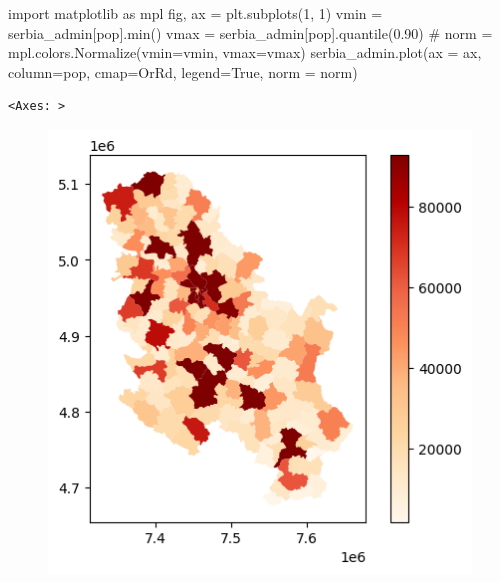\documentclass[
  letterpaper,
  DIV=11,
  numbers=noendperiod]{scrreprt}
\newenvironment{Shaded}{\begin{snugshade}}{\end{snugshade}}
\newcommand{\BuiltInTok}[1]{\textcolor[rgb]{0.00,0.23,0.31}{#1}}
\newcommand{\CommentTok}[1]{\textcolor[rgb]{0.37,0.37,0.37}{#1}}
\newcommand{\DecValTok}[1]{\textcolor[rgb]{0.68,0.00,0.00}{#1}}
\newcommand{\FloatTok}[1]{\textcolor[rgb]{0.68,0.00,0.00}{#1}}
\newcommand{\ImportTok}[1]{\textcolor[rgb]{0.00,0.46,0.62}{#1}}
\newcommand{\NormalTok}[1]{\textcolor[rgb]{0.00,0.23,0.31}{#1}}
\newcommand{\OperatorTok}[1]{\textcolor[rgb]{0.37,0.37,0.37}{#1}}
\newcommand{\StringTok}[1]{\textcolor[rgb]{0.13,0.47,0.30}{#1}}
\newcommand{\VariableTok}[1]{\textcolor[rgb]{0.07,0.07,0.07}{#1}}
\begin{document}
\begin{Shaded}
\begin{Highlighting}[]
\ImportTok{import}\NormalTok{ matplotlib }\ImportTok{as}\NormalTok{ mpl}
\NormalTok{fig, ax }\OperatorTok{=}\NormalTok{ plt.subplots(}\DecValTok{1}\NormalTok{, }\DecValTok{1}\NormalTok{)}
\NormalTok{vmin }\OperatorTok{=}\NormalTok{ serbia\_admin[}\StringTok{\textquotesingle{}pop\textquotesingle{}}\NormalTok{].}\BuiltInTok{min}\NormalTok{()}
\NormalTok{vmax }\OperatorTok{=}\NormalTok{ serbia\_admin[}\StringTok{\textquotesingle{}pop\textquotesingle{}}\NormalTok{].quantile(}\FloatTok{0.90}\NormalTok{) }\CommentTok{\# }
\NormalTok{norm }\OperatorTok{=}\NormalTok{ mpl.colors.Normalize(vmin}\OperatorTok{=}\NormalTok{vmin, vmax}\OperatorTok{=}\NormalTok{vmax)}
\NormalTok{serbia\_admin.plot(ax }\OperatorTok{=}\NormalTok{ ax, column}\OperatorTok{=}\StringTok{\textquotesingle{}pop\textquotesingle{}}\NormalTok{, cmap}\OperatorTok{=}\StringTok{\textquotesingle{}OrRd\textquotesingle{}}\NormalTok{, legend}\OperatorTok{=}\VariableTok{True}\NormalTok{, norm }\OperatorTok{=}\NormalTok{ norm)}
\end{Highlighting}
\end{Shaded}

\begin{verbatim}
<Axes: >
\end{verbatim}

\begin{figure}[H]

{\centering \includegraphics{labs/w02_maps_files/figure-pdf/cell-38-output-2.png}

}

\end{figure}
\end{document}
